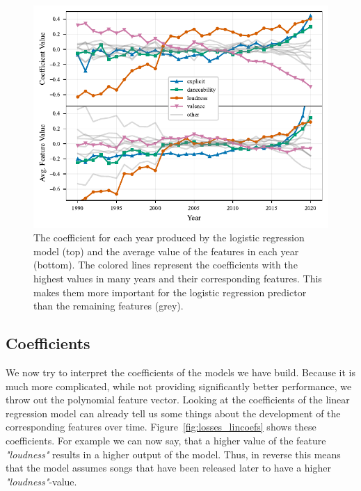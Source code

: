 \documentclass{article}
\begin{document}
\begin{figure}[t]
  \centering
  \includegraphics{coefs_avg}
  \caption{The coefficient for each year produced by the logistic regression model (top) and the average value of the features in each year (bottom). The colored lines represent the coefficients with the highest values in many years and their corresponding features. This makes them more important for the logistic regression predictor than the remaining features (grey).} 
  \label{fig:coefs_avg}
\end{figure}
\subsection{Coefficients}

We now try to interpret the coefficients of the models we have build. Because it is much more complicated, while not providing significantly better performance, we throw out the polynomial feature vector. Looking at the coefficients of the linear regression model can already tell us some things about the development of the corresponding features over time. Figure~\ref{fig:losses_lincoefs} shows these coefficients. For example we can now say, that a higher value of the feature \emph{"loudness"} results in a higher output of the model. Thus, in reverse this means that the model assumes songs that have been released later to have a higher \emph{"loudness"}-value.
\end{document}

